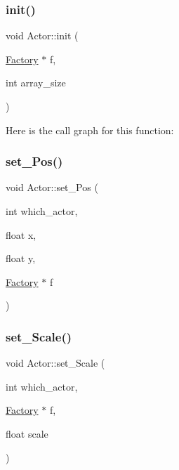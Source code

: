 \mbox{\label{namespace_actor_a66160c0692dd16998f8d7dd47ef575c1}} 
\subsubsection{\texorpdfstring{init()}{init()}}
{\footnotesize\ttfamily void Actor\+::init (\begin{DoxyParamCaption}\item[{\mbox{\hyperlink{struct_actor_1_1_factory}{Factory}} $\ast$}]{f,  }\item[{int}]{array\+\_\+size }\end{DoxyParamCaption})}

Here is the call graph for this function\+:
\mbox{\label{namespace_actor_af9c730185b601f67cc9aa44beb2b3e2a}} 
\subsubsection{\texorpdfstring{set\+\_\+\+Pos()}{set\_Pos()}}
{\footnotesize\ttfamily void Actor\+::set\+\_\+\+Pos (\begin{DoxyParamCaption}\item[{int}]{which\+\_\+actor,  }\item[{float}]{x,  }\item[{float}]{y,  }\item[{\mbox{\hyperlink{struct_actor_1_1_factory}{Factory}} $\ast$}]{f }\end{DoxyParamCaption})}

\mbox{\label{namespace_actor_a9a863bda46c95e2330f6c0d6e4a3cc42}} 
\subsubsection{\texorpdfstring{set\+\_\+\+Scale()}{set\_Scale()}}
{\footnotesize\ttfamily void Actor\+::set\+\_\+\+Scale (\begin{DoxyParamCaption}\item[{int}]{which\+\_\+actor,  }\item[{\mbox{\hyperlink{struct_actor_1_1_factory}{Factory}} $\ast$}]{f,  }\item[{float}]{scale }\end{DoxyParamCaption})}


